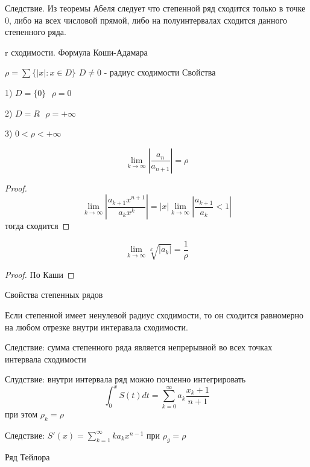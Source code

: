 Следствие. Из теоремы Абеля следует что степенной ряд сходится только в точке
0, либо на всех числовой прямой, либо на полуинтервалах сходится данного
степенного ряда.

\begin{title}
  r сходимости. Формула Коши-Адамара
\end{title}

$\rho = \sum\{ |x| : x \in D \}$ $D \not= 0$ - радиус сходимости
Свойства

1) $D = \{0\} ~~~ \rho = 0$

2) $D = R ~~~ \rho = +\infty$

3) $0 < \rho < +\infty$

\begin{theorem}
  $$
  \lim_{k \to \infty} \left| \frac{a_n}{a_{n+1}} \right| = \rho
  $$
\end{theorem}

\begin{proof}
  $$
  \lim_{k \to \infty} \left| \frac{a_{k+1} x^{n+1}}{a_k x^k} \right| =
  |x| \lim_{k \to \infty} \left| \frac{a_{k+1}}{a_k} < 1 \right|
  $$
  тогда сходится
\end{proof}

\begin{theorem}
  $$
  \lim_{k \to \infty} \sqrt[k]{|a_k|} = \frac{1}{\rho}
  $$
\end{theorem}

\begin{proof}
  По Каши
\end{proof}

\begin{title}
  Свойства степенных рядов
\end{title}

\begin{theorem}
  Если степенной имеет ненулевой радиус сходимости, то он сходится равномерно
  на любом отрезке внутри интеравала сходимости.
\end{theorem}

Следствие: сумма степенного ряда является непрерывной во всех точках интервала
сходимости

Слудствие: внутри интервала ряд можно почленно интегрировать
$$
\int_0^x S(t)dt = \sum_{k=0}^{\infty} a_k \frac{x_k+1}{n+1}
$$
при этом $\rho_k = \rho$

Следствие: $S'(x) = \sum_{k=1}^{\infty}k a_k x^{n-1}$ при $\rho_g = \rho$

\begin{title}
  Ряд Тейлора
\end{title}

